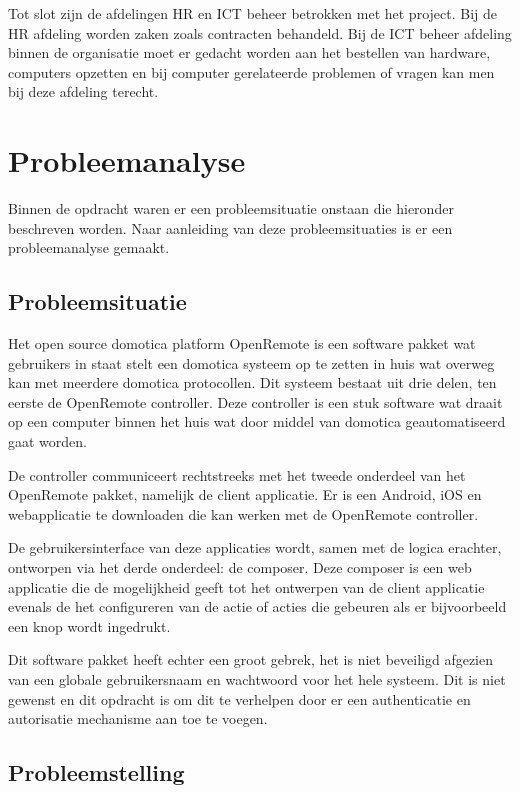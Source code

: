 \documentclass[]{article}
\begin{document}
Tot slot zijn de afdelingen HR en ICT beheer betrokken met het project. Bij
de HR afdeling worden zaken zoals contracten behandeld. Bij de ICT beheer
afdeling binnen de organisatie moet er gedacht worden aan het bestellen van
hardware, computers opzetten en bij computer gerelateerde problemen of
vragen kan men bij deze afdeling terecht.

\newpage
\section{Probleemanalyse}
Binnen de opdracht waren er een probleemsituatie onstaan die hieronder
beschreven worden. Naar aanleiding van deze probleemsituaties is er een
probleemanalyse gemaakt.

\subsection{Probleemsituatie}

Het open source domotica platform OpenRemote is een software pakket wat
gebruikers in staat stelt een domotica systeem op te zetten in huis wat
overweg kan met meerdere domotica protocollen. Dit systeem bestaat uit drie
delen, ten eerste de OpenRemote controller. Deze controller is een stuk
software wat draait op een computer binnen het huis wat door middel van
domotica geautomatiseerd gaat worden.

De controller communiceert rechtstreeks met het tweede onderdeel van het
OpenRemote pakket, namelijk de client applicatie. Er is een Android, iOS en
webapplicatie te downloaden die kan werken met de OpenRemote controller.

De gebruikersinterface van deze applicaties wordt, samen met de logica
erachter, ontworpen via het derde onderdeel: de composer. Deze composer is
een web applicatie die de mogelijkheid geeft tot het ontwerpen van de
client applicatie evenals de het configureren van de actie of acties die
gebeuren als er bijvoorbeeld een knop wordt ingedrukt.

Dit software pakket heeft echter een groot gebrek, het is niet beveiligd
afgezien van een globale gebruikersnaam en wachtwoord voor het hele
systeem. Dit is niet gewenst en dit opdracht is om dit te verhelpen door
er een authenticatie en autorisatie mechanisme aan toe te voegen.

\newpage
\subsection{Probleemstelling}
\end{document}
